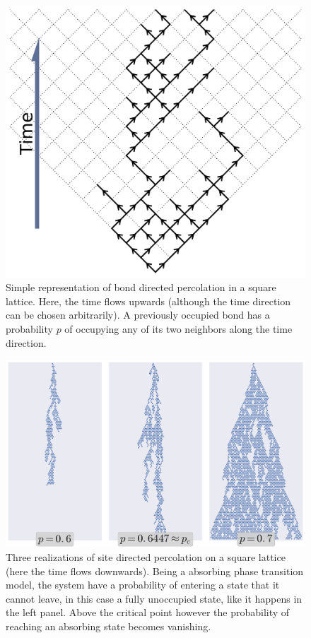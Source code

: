 \begin{figure}
\begin{center}
    \includegraphics[scale=0.5]{chapters/ch5-anis/figs/dperco_scheme}
\end{center}
\caption{Simple representation of bond directed percolation in a square
    lattice. Here, the time flows upwards (although the time direction can be
    chosen arbitrarily). A previously occupied bond has a probability $p$ of
    occupying any of its two neighbors along the time direction.}
\label{fig:dperco_scheme}
\end{figure}

\begin{figure}
\begin{center}
    \includegraphics[scale=0.5]{chapters/ch5-anis/figs/dperco}
\end{center}
\caption{Three realizations of site directed percolation on a square lattice
    (here the time flows downwards). Being a absorbing phase transition model,
    the system have a probability of entering a state that it cannot leave, in
    this case a fully unoccupied state, like it happens in the left panel.
    Above the critical point however the probability of reaching an absorbing
    state becomes vanishing.}
\label{fig:dperco}
\end{figure}

